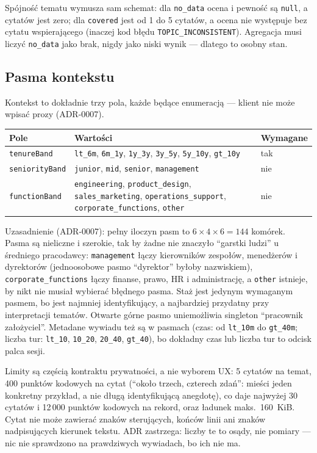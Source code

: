 Spójność tematu wymusza sam schemat: dla \texttt{no\_data} ocena i pewność są
\texttt{null}, a cytatów jest zero; dla \texttt{covered} jest od 1 do 5
cytatów, a ocena nie występuje bez cytatu wspierającego (inaczej kod błędu
\texttt{TOPIC\_INCONSISTENT}). Agregacja musi liczyć \texttt{no\_data} jako
brak, nigdy jako niski wynik --- dlatego to osobny stan.

\subsection{Pasma kontekstu}

Kontekst to dokładnie trzy pola, każde będące enumeracją --- klient nie może
wpisać prozy (ADR-0007).

\begin{tabularx}{\linewidth}{@{}lXl@{}}
\toprule
Pole & Wartości & Wymagane \\
\midrule
\texttt{tenureBand} & \texttt{lt\_6m}, \texttt{6m\_1y}, \texttt{1y\_3y}, \texttt{3y\_5y}, \texttt{5y\_10y}, \texttt{gt\_10y} & tak \\
\texttt{seniorityBand} & \texttt{junior}, \texttt{mid}, \texttt{senior}, \texttt{management} & nie \\
\texttt{functionBand} & \texttt{engineering}, \texttt{product\_design}, \texttt{sales\_marketing}, \texttt{operations\_support}, \texttt{corporate\_functions}, \texttt{other} & nie \\
\bottomrule
\end{tabularx}

\medskip
Uzasadnienie (ADR-0007): pełny iloczyn pasm to $6\times4\times6 = 144$ komórek.
Pasma są nieliczne i szerokie, tak by żadne nie znaczyło ``garstki ludzi'' u
średniego pracodawcy: \texttt{management} łączy kierowników zespołów, menedżerów
i dyrektorów (jednoosobowe pasmo ``dyrektor'' byłoby nazwiskiem),
\texttt{corporate\_functions} łączy finanse, prawo, HR i administrację, a
\texttt{other} istnieje, by nikt nie musiał wybierać błędnego pasma. Staż jest
jedynym wymaganym pasmem, bo jest najmniej identyfikujący, a najbardziej
przydatny przy interpretacji tematów. Otwarte górne pasmo uniemożliwia
singleton ``pracownik założyciel''. Metadane wywiadu też są w pasmach
(czas: od \texttt{lt\_10m} do \texttt{gt\_40m}; liczba tur: \texttt{lt\_10},
\texttt{10\_20}, \texttt{20\_40}, \texttt{gt\_40}), bo dokładny czas lub liczba
tur to odcisk palca sesji.

Limity są częścią kontraktu prywatności, a nie wyborem UX: 5 cytatów na temat,
400 punktów kodowych na cytat (``około trzech, czterech zdań'': mieści jeden
konkretny przykład, a nie długą identyfikującą anegdotę), co daje najwyżej 30
cytatów i 12\,000 punktów kodowych na rekord, oraz ładunek maks.\ 160~KiB.
Cytat nie może zawierać znaków sterujących, końców linii ani znaków
nadpisujących kierunek tekstu. ADR zastrzega: liczby te to osądy, nie
pomiary --- nic nie sprawdzono na prawdziwych wywiadach, bo ich nie ma.

